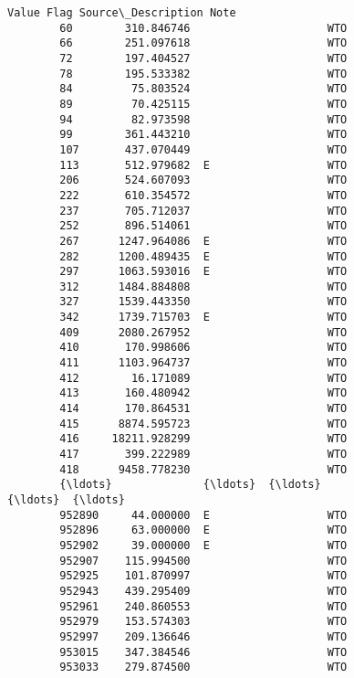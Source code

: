 \documentclass[11pt]{article}
\begin{document}
\begin{Verbatim}[commandchars=\\\{\}]
                       Value Flag Source\_Description Note  
        60        310.846746                     WTO       
        66        251.097618                     WTO       
        72        197.404527                     WTO       
        78        195.533382                     WTO       
        84         75.803524                     WTO       
        89         70.425115                     WTO       
        94         82.973598                     WTO       
        99        361.443210                     WTO       
        107       437.070449                     WTO       
        113       512.979682  E                  WTO       
        206       524.607093                     WTO       
        222       610.354572                     WTO       
        237       705.712037                     WTO       
        252       896.514061                     WTO       
        267      1247.964086  E                  WTO       
        282      1200.489435  E                  WTO       
        297      1063.593016  E                  WTO       
        312      1484.884808                     WTO       
        327      1539.443350                     WTO       
        342      1739.715703  E                  WTO       
        409      2080.267952                     WTO       
        410       170.998606                     WTO       
        411      1103.964737                     WTO       
        412        16.171089                     WTO       
        413       160.480942                     WTO       
        414       170.864531                     WTO       
        415      8874.595723                     WTO       
        416     18211.928299                     WTO       
        417       399.222989                     WTO       
        418      9458.778230                     WTO       
        {\ldots}              {\ldots}  {\ldots}                {\ldots}  {\ldots}  
        952890     44.000000  E                  WTO       
        952896     63.000000  E                  WTO       
        952902     39.000000  E                  WTO       
        952907    115.994500                     WTO       
        952925    101.870997                     WTO       
        952943    439.295409                     WTO       
        952961    240.860553                     WTO       
        952979    153.574303                     WTO       
        952997    209.136646                     WTO       
        953015    347.384546                     WTO       
        953033    279.874500                     WTO       

\end{Verbatim}
\end{document}
